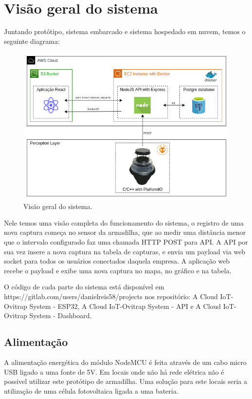 \documentclass[
	12pt,				%
	openright,			%
	oneside,			%
	a4paper,			%
	chapter=TITLE,		%
	english,			%
	brazil				%
	]{abntex2}
\begin{document}
\chapter{Visão geral do sistema}

Juntando protótipo, sistema embarcado e sistema hospedado em nuvem, temos o seguinte diagrama:

\begin{figure}[H]
    \centering
    \includegraphics[scale=0.6]{imagens/diagramacloudarmadilha.png}
    \caption{Visão geral do sistema.}
        \label{fig:diagramacloudarmadilha}
    \end{figure}


Nele temos uma visão completa do funcionamento do sistema, o registro de uma nova captura começa no sensor da armadilha, que ao medir uma distância menor
que o intervalo configurado faz uma chamada HTTP POST para API. A API por sua vez insere a nova captura na tabela de capturas, e 
envia um payload via web socket para todos os usuários conectados daquela empresa. A aplicação web recebe o payload e exibe uma nova captura
no mapa, no gráfico e na tabela. 

O código de cada parte do sistema está disponível em https://gitlab.com/users/danielreis58/projects nos repositório:
A Cloud IoT-Ovitrap System - ESP32, A Cloud IoT-Ovitrap System - API e A Cloud IoT-Ovitrap System - Dashboard.

\section{Alimentação}

A alimentação energética do módulo NodeMCU é feita através de um cabo micro USB ligado a uma fonte de 5V. Em locais onde não há 
rede elétrica não é possivel utilizar este protótipo de armadilha. Uma solução para este locais seria a utilização de uma célula fotovoltaica ligada a uma 
bateria.
\end{document}
